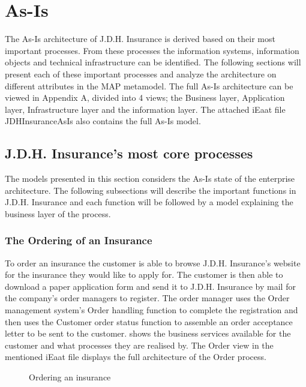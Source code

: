 \section{As-Is}
\label{sec:as_is}
The As-Is architecture of J.D.H. Insurance is derived based on their most important processes. From these processes the information systems, information objects and technical infrastructure can be identified. The following sections will present each of these important processes and analyze the architecture on different attributes in the MAP metamodel. The full As-Is architecture can be viewed in Appendix A, divided into 4 views; the Business layer, Application layer, Infrastructure layer and the information layer. The attached iEaat file JDHInsuranceAsIs also contains the full As-Is model.
%
\subsection{J.D.H. Insurance's most core processes}
\label{sec:coreShit}
The models presented in this section considers the As-Is state of the enterprise architecture. The following subsections will describe the important functions in J.D.H. Insurance and each function will be followed by a model explaining the business layer of the process.
%
\subsubsection{The Ordering of an Insurance}
\label{sec:order}
To order an insurance the customer is able to browse J.D.H. Insurance's website for the insurance they would like to apply for. The customer is then able to download a paper application form and send it to J.D.H. Insurance by mail for the company's order managers to register. The order manager uses the Order management system's Order handling function to complete the registration and then uses the Customer order status function to assemble an order acceptance letter to be sent to the customer.  shows the business services available for the customer and what processes they are realised by. The Order view in the mentioned iEaat file displays the full architecture of the Order process. 
\begin{center}
	\begin{figure}[H]
		\centering
		\setlength\fboxsep{7pt}
		\setlength\fboxrule{0.5pt}
		\caption{Ordering an insurance}
		\label{fig:map_order}
	\end{figure}
\end{center}
